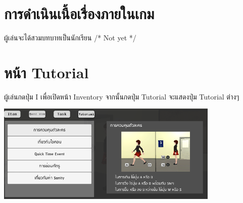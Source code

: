 \section*{การดำเนินเนื้อเรื่องภายในเกม}
ผู้เล่นจะได้สวมบทบาทเป็นนักเรียน /* Not yet */

\section*{หน้า Tutorial}
ผู้เล่นกดปุ่ม I เพื่อเปิดหน้า Inventory จากนั้นกดปุ่ม Tutorial จะแสดงปุ่ม Tutorial ต่างๆ
\begin{center}
    \includegraphics[width=0.8\textwidth, height=0.25\textheight]{Images/Tutorial Image.png}
\end{center}